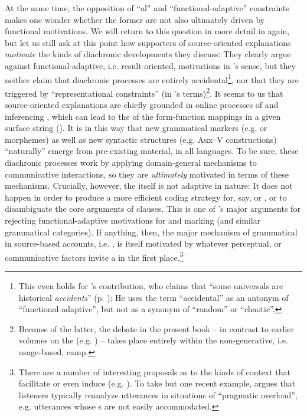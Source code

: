 \documentclass[output=paper]{langsci/langscibook}
\begin{document}
At the same time, the opposition of “al” and “functional-adaptive” constraints makes one wonder whether the former are not also ultimately driven by functional motivations. We will return to this question in more detail in  again, but let us still ask at this point how supporters of source-oriented explanations \textit{motivate} the kinds of diachronic developments they discuss: They clearly argue against functional-adaptive, i.e. result-oriented, motivations in ’s sense, but they neither claim that diachronic processes are entirely accidental\largerpage\footnote{This even holds for ’s contribution, who claims that “some universals are historical \textit{accidents}” (p. \pageref{p:collins:historicalaccidents}): He uses the term “accidental” as an antonym of “functional-adaptive”, but not as a synonym of “random” or “chaotic”.}, nor that they are triggered by  “representational constraints” (in ’s terms)\footnote{Because of the latter, the debate in the present book – in contrast to earlier volumes on the  (e.g. \citealt{Hawkins1988_ExplEd,Good2008_Change}) – takes place entirely within the non-generative, i.e. usage-based, camp.}. It seems to us that source-oriented explanations are chiefly grounded in online processes of  and inferencing \citep{Bybee2010}, which can lead to the  of the form-function mappings in a given surface string (\citealt{Croft2000,DeSmet2009}). It is in this way that new grammatical markers (e.g.  or  morphemes) as well as new syntactic structures (e.g. Aux–V constructions) “naturally” emerge from pre-existing material, in all languages. To be sure, these diachronic processes work by applying domain-general  mechanisms to communicative interactions, so they are \textit{ultimately} motivated in terms of these mechanisms. Crucially, however, the  itself is not adaptive in nature: It does not happen in order to produce a more efficient coding strategy for, say,  or , or to disambiguate the core arguments of  clauses. This is one of ’s major arguments for rejecting functional-adaptive motivations for  and  marking (and similar grammatical categories). If anything, then, the major mechanism of grammatical  in source-based accounts, i.e. , is itself motivated by whatever perceptual,  or communicative factors invite a  in the first place.\footnote{There 
\label{fn:epilog:8}
are a number of interesting proposals as to the kinds of context that facilitate or even induce  (e.g. \citealt{DetgesWaltereit2002,HansenWaltereit2006,RosemeyerGrossman2017,SchwenterWaltereit2009,TraugottDasher2002}). To take but one recent example, \citet{Eckardt2009} argues that listeners typically reanalyze utterances in situations of “pragmatic overload”, e.g. utterances whose s are not easily accommodated.}
\end{document}
